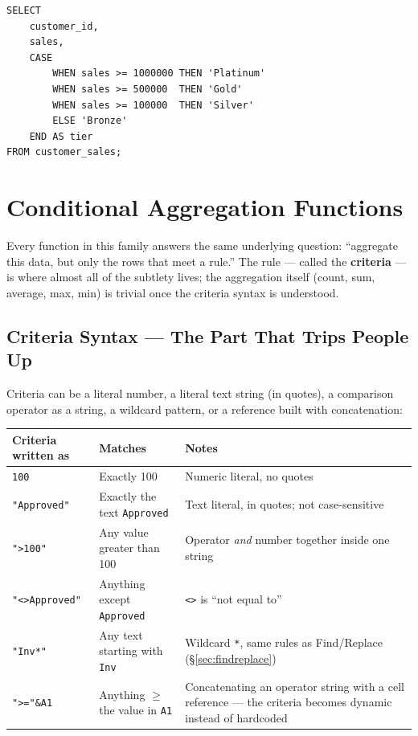 \documentclass[11pt,a4paper]{article}
\begin{document}
\begin{lstlisting}[style=sqlstyle, caption={The bonus schedule as a SQL CASE expression}]
SELECT
    customer_id,
    sales,
    CASE
        WHEN sales >= 1000000 THEN 'Platinum'
        WHEN sales >= 500000  THEN 'Gold'
        WHEN sales >= 100000  THEN 'Silver'
        ELSE 'Bronze'
    END AS tier
FROM customer_sales;
\end{lstlisting}

\section{Conditional Aggregation Functions}
\label{sec:condaggregation}

\begin{keyconcept}
Every function in this family answers the same underlying question: ``aggregate this data, but only the rows that meet a rule.'' The rule --- called the \textbf{criteria} --- is where almost all of the subtlety lives; the aggregation itself (count, sum, average, max, min) is trivial once the criteria syntax is understood.
\end{keyconcept}

\subsection{Criteria Syntax --- The Part That Trips People Up}

Criteria can be a literal number, a literal text string (in quotes), a comparison operator as a string, a wildcard pattern, or a reference built with concatenation:

\begin{center}
\begin{tabular}{@{}L{3.6cm}L{3.4cm}L{5.4cm}@{}}
\toprule
\textbf{Criteria written as} & \textbf{Matches} & \textbf{Notes} \\
\midrule
\texttt{100} & Exactly 100 & Numeric literal, no quotes \\
\texttt{"Approved"} & Exactly the text \texttt{Approved} & Text literal, in quotes; not case-sensitive \\
\texttt{">100"} & Any value greater than 100 & Operator \emph{and} number together inside one string \\
\texttt{"<>Approved"} & Anything except \texttt{Approved} & \texttt{<>} is ``not equal to'' \\
\texttt{"Inv*"} & Any text starting with \texttt{Inv} & Wildcard \texttt{*}, same rules as Find/Replace (\S\ref{sec:findreplace}) \\
\texttt{">="\&A1} & Anything $\geq$ the value in \texttt{A1} & Concatenating an operator string with a cell reference --- the criteria becomes dynamic instead of hardcoded \\
\bottomrule
\end{tabular}
\end{center}
\end{document}
